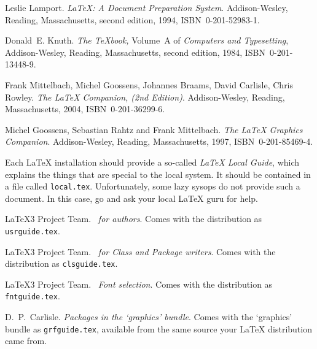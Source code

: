 \begin{thebibliography}{99}
 Leslie Lamport.  \newblock \emph{{\LaTeX:} A Document
    Preparation System}.  \newblock Addison-Wesley, Reading,
  Massachusetts, second edition, 1994, ISBN~0-201-52983-1.

 Donald~E. Knuth.  \newblock \textit{The \TeX{}book,}
  Volume~A of \textit{Computers and Typesetting}, Addison-Wesley,
  Reading, Massachusetts, second edition, 1984, ISBN~0-201-13448-9.

 Frank Mittelbach, Michel Goossens, Johannes Braams,
  David Carlisle, Chris Rowley.  \newblock \emph{The {\LaTeX} Companion, (2nd Edition)}.  \newblock
  Addison-Wesley, Reading, Massachusetts, 2004, ISBN~0-201-36299-6.

 Michel Goossens, Sebastian Rahtz and Frank
  Mittelbach.  \newblock \emph{The {\LaTeX} Graphics Companion}.  \newblock
  Addison-Wesley, Reading, Massachusetts, 1997, ISBN~0-201-85469-4.

 Each \LaTeX{} installation should provide a so-called
  \emph{\LaTeX{} Local Guide}, which explains the things that are
  special to the local system.  It should be contained in a file called
  \texttt{local.tex}. Unfortunately, some lazy sysops do not provide such a
  document. In this case, go and ask your local \LaTeX{} guru for help.

 \LaTeX3 Project Team.  \newblock \emph{\LaTeXe~for
    authors}.  \newblock Comes with the \LaTeXe{} distribution as
  \texttt{usrguide.tex}.

 \LaTeX3 Project Team.  \newblock \emph{\LaTeXe~for
    Class and Package writers}.  \newblock Comes with the \LaTeXe{}
  distribution as \texttt{clsguide.tex}.

 \LaTeX3 Project Team.  \newblock \emph{\LaTeXe~Font
    selection}.  \newblock Comes with the \LaTeXe{} distribution as
  \texttt{fntguide.tex}.

 D.~P.~Carlisle.  \newblock \emph{Packages in the
    `graphics' bundle}.  \newblock Comes with the `graphics' bundle as
  \texttt{grfguide.tex}, available from the same source your \LaTeX{}
  distribution came from.


\end{thebibliography}
